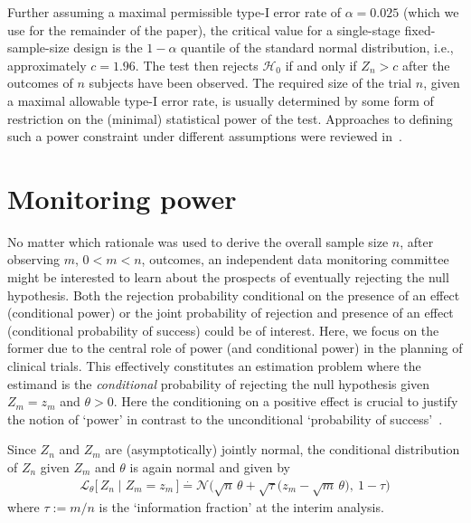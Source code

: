 \documentclass[12pt]{article}
\begin{document}
Further assuming a maximal permissible type-I error rate of $\alpha=0.025$ (which we use for the remainder of the paper), the critical value for a single-stage fixed-sample-size design is the
$1-\alpha$ quantile of the standard normal distribution, i.e., approximately $c=1.96$.
The test then rejects $\mathcal{H}_0$ if and only if $Z_n > c$ after the outcomes of $n$ subjects have been observed.
The required size of the trial $n$, given a maximal allowable type-I error
rate, is usually determined by some form of restriction on
the (minimal) statistical power of the test.
Approaches to defining such a power constraint under
different assumptions were reviewed in~\cite{kunzmann2020}.



\section{Monitoring power} %
\label{sec:monitoring-power}

No matter which rationale was used to derive the overall sample size $n$,
after observing $m$, $0<m<n$, outcomes,
an independent data monitoring committee might be interested to learn about the prospects of
eventually rejecting the null hypothesis.
Both the rejection probability conditional on the presence of an effect (conditional power) or the joint probability of rejection and presence of an effect (conditional probability of success) could be of interest.
Here, we focus on the former due to the central role of
power (and conditional power) in the planning of clinical trials.
This effectively constitutes an estimation problem where the estimand is
the \emph{conditional} probability of rejecting the null hypothesis given
$Z_m=z_m$ and $\theta > 0$.
Here the conditioning on a positive effect is crucial to justify the notion
of `power' in contrast to the unconditional `probability of success'~\cite{kunzmann2020}.

Since $Z_n$ and $Z_m$ are (asymptotically) jointly normal, the conditional distribution of $Z_n$ given $Z_m$ and $\theta$ is again normal and
given by
\begin{align}
    \mathcal{L}_\theta\big[\, Z_n \mid Z_m = z_m \,\big] \stackrel{\cdot}{=} \mathcal{N}\Big(\sqrt{n}\,\theta + \sqrt{\tau}\big(z_{m} - \sqrt{m}\,\theta\big),\ 1 - \tau\Big) \label{eq:joint-distribution}
\end{align}
where $\tau:=m/n$ is the `information fraction' at the interim analysis.
\end{document}
